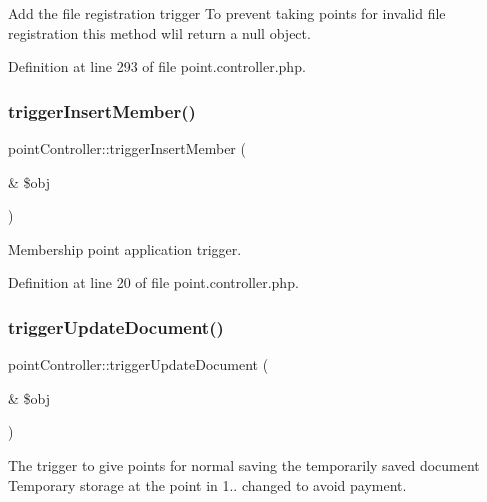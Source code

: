 Add the file registration trigger To prevent taking points for invalid file registration this method wlil return a null object. 



Definition at line 293 of file point.\+controller.\+php.

\mbox{\label{classpointController_a98cfacf9f4a7d0d3f5d0d692ba6d8dc3}} 
\subsubsection{\texorpdfstring{trigger\+Insert\+Member()}{triggerInsertMember()}}
{\footnotesize\ttfamily point\+Controller\+::trigger\+Insert\+Member (\begin{DoxyParamCaption}\item[{\&}]{\$obj }\end{DoxyParamCaption})}



Membership point application trigger. 



Definition at line 20 of file point.\+controller.\+php.

\mbox{\label{classpointController_a05fba328c369a12065cba849e5c0539c}} 
\subsubsection{\texorpdfstring{trigger\+Update\+Document()}{triggerUpdateDocument()}}
{\footnotesize\ttfamily point\+Controller\+::trigger\+Update\+Document (\begin{DoxyParamCaption}\item[{\&}]{\$obj }\end{DoxyParamCaption})}



The trigger to give points for normal saving the temporarily saved document Temporary storage at the point in 1.. changed to avoid payment. 



